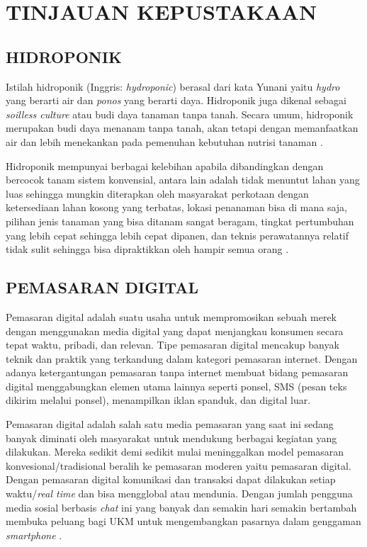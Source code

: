 \fancyhf{} 
\fancyfoot[C]{\thepage}
\chapter{TINJAUAN KEPUSTAKAAN}               

\section{\uppercase{Hidroponik}}
Istilah hidroponik (Inggris: \textit{hydroponic}) berasal dari kata Yunani yaitu \textit{hydro} yang berarti air dan \textit{ponos} yang berarti daya. Hidroponik juga dikenal sebagai \textit{soilless culture} atau budi daya tanaman tanpa tanah. Secara umum, hidroponik merupakan budi daya menanam tanpa tanah, akan tetapi dengan memanfaatkan air dan lebih menekankan pada pemenuhan kebutuhan nutrisi tanaman \citep{alviani2015bertanam}.

\par Hidroponik mempunyai berbagai kelebihan apabila dibandingkan dengan bercocok tanam sistem konvensial, antara lain adalah tidak menuntut lahan yang luas sehingga mungkin diterapkan oleh masyarakat perkotaan dengan ketersediaan lahan kosong yang terbatas, lokasi penanaman bisa di mana saja, pilihan jenis tanaman yang bisa ditanam sangat beragam, tingkat pertumbuhan yang lebih cepat sehingga lebih cepat dipanen, dan teknis perawatannya relatif tidak sulit sehingga bisa dipraktikkan oleh hampir semua orang \citep{iqbal2016simpel}.

\section{\uppercase{Pemasaran Digital}}
Pemasaran digital adalah suatu usaha untuk mempromosikan sebuah merek dengan menggunakan media digital yang dapat menjangkau konsumen secara tepat waktu, pribadi, dan relevan. Tipe pemasaran digital mencakup banyak teknik dan praktik yang terkandung dalam kategori pemasaran internet. Dengan adanya ketergantungan pemasaran tanpa internet membuat bidang pemasaran digital menggabungkan elemen utama lainnya seperti ponsel, SMS (pesan teks dikirim melalui ponsel), menampilkan iklan spanduk, dan digital luar. \citep{wikipedia2021}

\par Pemasaran digital adalah salah satu media pemasaran yang saat ini sedang banyak diminati oleh masyarakat untuk mendukung berbagai kegiatan yang dilakukan. Mereka sedikit demi sedikit mulai meninggalkan model pemasaran konvesional/tradisional beralih ke pemasaran moderen yaitu pemasaran digital. Dengan pemasaran digital komunikasi dan transaksi dapat dilakukan setiap waktu/\textit{real time} dan bisa mengglobal atau mendunia. Dengan jumlah pengguna media sosial berbasis \textit{chat} ini yang banyak dan semakin hari semakin bertambah membuka peluang bagi UKM untuk mengembangkan pasarnya dalam genggaman \textit{smartphone} \citep{pradiani2017pengaruh}.

